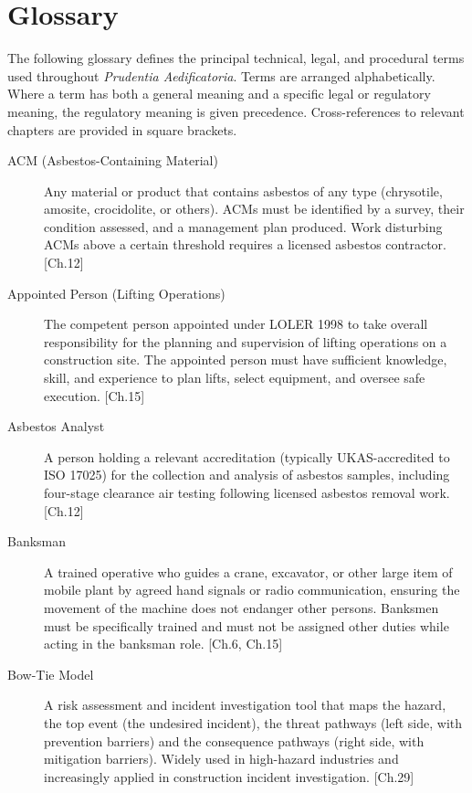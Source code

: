 \chapter{Glossary}
\label{chap:Glossary}

The following glossary defines the principal technical, legal, and procedural terms used throughout \textit{Prudentia Aedificatoria}. Terms are arranged alphabetically. Where a term has both a general meaning and a specific legal or regulatory meaning, the regulatory meaning is given precedence. Cross-references to relevant chapters are provided in square brackets.

\begin{description}

\item[ACM (Asbestos-Containing Material)] Any material or product that contains asbestos of any type (chrysotile, amosite, crocidolite, or others). ACMs must be identified by a survey, their condition assessed, and a management plan produced. Work disturbing ACMs above a certain threshold requires a licensed asbestos contractor. [Ch.12]

\item[Appointed Person (Lifting Operations)] The competent person appointed under LOLER 1998 to take overall responsibility for the planning and supervision of lifting operations on a construction site. The appointed person must have sufficient knowledge, skill, and experience to plan lifts, select equipment, and oversee safe execution. [Ch.15]

\item[Asbestos Analyst] A person holding a relevant accreditation (typically UKAS-accredited to ISO 17025) for the collection and analysis of asbestos samples, including four-stage clearance air testing following licensed asbestos removal work. [Ch.12]

\item[Banksman] A trained operative who guides a crane, excavator, or other large item of mobile plant by agreed hand signals or radio communication, ensuring the movement of the machine does not endanger other persons. Banksmen must be specifically trained and must not be assigned other duties while acting in the banksman role. [Ch.6, Ch.15]

\item[Bow-Tie Model] A risk assessment and incident investigation tool that maps the hazard, the top event (the undesired incident), the threat pathways (left side, with prevention barriers) and the consequence pathways (right side, with mitigation barriers). Widely used in high-hazard industries and increasingly applied in construction incident investigation. [Ch.29]


\end{description}
